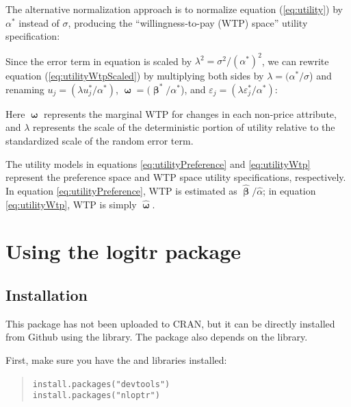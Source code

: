 \documentclass[article]{jss}
\begin{document}
The alternative normalization approach is to normalize equation
(\ref{eq:utility}) by \(\alpha^*\) instead of \(\sigma\), producing the
``willingness-to-pay (WTP) space'' utility specification:



Since the error term in equation is scaled by
\(\lambda^2 = \sigma^2/(\alpha^{*})^2\), we can rewrite equation
(\ref{eq:utilityWtpScaled}) by multiplying both sides by
\(\lambda= (\alpha^{*} / \sigma\)) and renaming
\(u_j = (\lambda u^*_j / \alpha^*)\),
\(\boldsymbol\upomega= (\boldsymbol\upbeta^{*} / \alpha^{*}\)), and
\(\varepsilon_j = (\lambda \varepsilon^*_j / \alpha^*)\):



Here \(\boldsymbol\upomega\) represents the marginal WTP for changes in
each non-price attribute, and \(\lambda\) represents the scale of the
deterministic portion of utility relative to the standardized scale of
the random error term.

The utility models in equations \ref{eq:utilityPreference} and
\ref{eq:utilityWtp} represent the preference space and WTP space utility
specifications, respectively. In equation \ref{eq:utilityPreference},
WTP is estimated as \(\hat{\boldsymbol\upbeta} / \hat{\alpha}\); in
equation \ref{eq:utilityWtp}, WTP is simply
\(\hat{\boldsymbol\upomega}\).

\newpage

\hypertarget{using-the-logitr-package}{%
\section{Using the logitr package}\label{using-the-logitr-package}}

\hypertarget{installation}{%
\subsection{Installation}\label{installation}}

This package has not been uploaded to CRAN, but it can be directly
installed from Github using the  library. The package also
depends on the  library.

First, make sure you have the  and  libraries
installed:

\begin{quote}
\texttt{install.packages("devtools")}~\\
\texttt{install.packages("nloptr")}
\end{quote}
\end{document}
